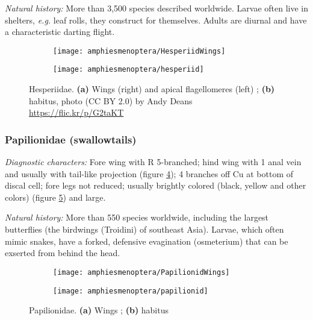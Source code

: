 \noindent{}\textit{Natural history:} More than 3,500 species described worldwide. Larvae often live in shelters, \textit{e.g.} leaf rolls, they construct for themselves. Adults are diurnal and have a characteristic darting flight.

\begin{figure}[ht!]
    \centering
    \begin{subfigure}[ht!]{0.36\textwidth}
        \texttt{[image: amphiesmenoptera/HesperiidWings]}
        \caption{}
        \label{fig:hesperiid1}
    \end{subfigure}
    \hfill
    \begin{subfigure}[ht!]{0.55\textwidth}
        \texttt{[image: amphiesmenoptera/hesperiid]}
        \caption{}
        \label{fig:hesperiid2}
    \end{subfigure}
    \caption{Hesperiidae. \textbf{(a)} Wings (right) and apical flagellomeres (left) \citep[][Fig. 5]{bhl37915}; \textbf{(b)} habitus, photo (CC BY 2.0) by Andy Deans \url{https://flic.kr/p/G2taKT}}\label{fig:hesperiids}
\end{figure}

\subsubsection{Papilionidae (swallowtails)}
\noindent{}\textit{Diagnostic characters:} Fore wing with R 5-branched; hind wing with 1 anal vein and usually with tail-like projection (figure \ref{fig:papilionid1}); 4 branches off Cu at bottom of discal cell; fore legs not reduced; usually brightly colored (black, yellow and other colors) (figure \ref{fig:papilionid2}) and large.\vspace{3mm}

\noindent{}\textit{Natural history:} More than 550 species worldwide, including the largest butterflies (the birdwings (Troidini) of southeast Asia). Larvae, which often mimic snakes, have a forked, defensive evagination (osmeterium) that can be exserted from behind the head.\vspace{3mm}

\begin{figure}[ht!]
    \centering
    \begin{subfigure}[ht!]{0.28\textwidth}
        \texttt{[image: amphiesmenoptera/PapilionidWings]}
        \caption{}
        \label{fig:papilionid1}
    \end{subfigure}
    \hfill 
    \begin{subfigure}[ht!]{0.6\textwidth}
        \texttt{[image: amphiesmenoptera/papilionid]}
        \caption{}
        \label{fig:papilionid2}
    \end{subfigure}
    \caption{Papilionidae. \textbf{(a)} Wings \citep[Fig. 350]{comstock1918wings}; \textbf{(b)} habitus \citep[modified from][Fig. 317]{bhlitem38199}}\label{fig:papilionids}
\end{figure}

